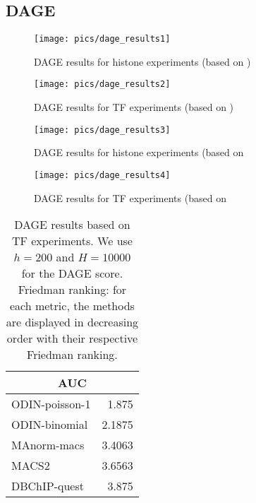 \clearpage
\subsection{DAGE}

\begin{figure}[h!]
\begin{center}
   \texttt{[image: pics/dage\_results1]}
\end{center}
\caption[DAGE curves for TLR4 study (histones)]{DAGE results for histone experiments (based on \cite{kaikonnen2013})}
\label{fig_dage1}
\end{figure}

\begin{figure}[ht]
\begin{center}
   \texttt{[image: pics/dage\_results2]}
\end{center}
\caption[DAGE curves for TLR4 study (TFs)] {DAGE results for TF experiments (based on \cite{kaikonnen2013})}
\label{fig_dage2}
\end{figure}

\begin{figure}[ht]
\begin{center}
   \texttt{[image: pics/dage\_results3]}
\end{center}
\caption[DAGE curves for DC study (histones)]{DAGE results for histone experiments (based on \cite{Lin2015}}
\label{fig_dage3}
\end{figure}

\begin{figure}[ht]
\begin{center}
   \texttt{[image: pics/dage\_results4]}
\end{center}
\caption[DAGE curves for DC study (TFs)]{DAGE results for TF experiments (based on \cite{Lin2015}}
\label{fig_dage4}
\end{figure}

\clearpage

\begin{table}[h!]
\begin{center}
\renewcommand{\arraystretch}{1.2}
  \begin{tabular}{ |lr| }
    \hline
    \multicolumn{2}{|c|}{\textbf{AUC}} \\
    \hline
    ODIN-poisson-1 & 1.875 \\
    ODIN-binomial & 2.1875 \\
    MAnorm-macs & 3.4063 \\
    MACS2 & 3.6563 \\
    DBChIP-quest & 3.875 \\
    \hline
  \end{tabular}
\end{center}
\caption[Friedman ranking of DAGE results for TF experiments]{DAGE results based on TF experiments. We use $h=200$ and $H=10000$ for the DAGE score. Friedman ranking: for each metric, the methods are displayed in decreasing order with their respective Friedman ranking.}
\label{tab_dage_tf}
\end{table}



